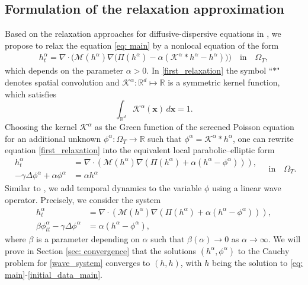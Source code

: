 \documentclass[11pt]{article}
\numberwithin{equation}{section}
\newtheorem{counter example}[theorem]{Counter Example}
\numberwithin{equation}{section}
\numberwithin{equation}{section}
\begin{document}
\subsection{Formulation of the relaxation approximation}
Based on the relaxation approaches for diffusive-dispersive equations in \cite{corli2012singular, corli2014parabolic}, we propose to relax the equation \eqref{eq: main} by a nonlocal equation of the form 
\begin{align}\label{first_relaxation}
    h^{\alpha}_t=\nabla\cdot\big(\mathcal{M}(h^{\alpha})\nabla \big(\Pi(h^{\alpha})-\alpha (\mathcal{K}^{\alpha} \ast h^{\alpha}-h^{\alpha})\big)\big)\quad \mathrm{in}\quad \Omega_T,
\end{align}
which depends on the parameter $\alpha>0$. In \eqref{first_relaxation} the symbol ``$\ast$" denotes spatial convolution and $\mathcal{K}^{\alpha}: \mathbb{R}^d\mapsto \mathbb{R}$ is a symmetric kernel function, which satisfies 
\[
\int_{\mathbb{R}^d} \mathcal{K}^{\alpha}(\mathbf{x})\, d\mathbf{x}=1.
\]
Choosing the kernel $\mathcal{K}^\alpha$ as the Green function \cite{corli2012singular} of the screened Poisson equation for an additional unknown $\phi^{\alpha}:\Omega_T\rightarrow \mathbb{R}$ such that $\phi^{\alpha}=\mathcal{K}^{\alpha}\ast h^{\alpha}$,  
one can rewrite equation \eqref{first_relaxation} into the equivalent local parabolic–elliptic form
\begin{equation}\label{local_relaxation}
\begin{aligned}
h^{\alpha}_t&=\nabla\cdot(\mathcal{M}(h^{\alpha})\nabla(\Pi(h^{\alpha})+\alpha(h^{\alpha}-\phi^{\alpha}))),\\
   -\gamma \Delta \phi^{\alpha}+\alpha \phi^{\alpha}&=\alpha h^{\alpha}
\end{aligned}
\quad \mathrm{in}\quad \Omega_T.
\end{equation}
Similar to \cite{barthwal2025relaxation, dhaouadi2025first}, we add temporal dynamics to the variable $\phi$ using a linear wave operator. Precisely, we consider the system
\begin{equation}\label{wave_system}
\begin{aligned}
h^{\alpha}_t&=\nabla\cdot(\mathcal{M}(h^{\alpha})\nabla(\Pi(h^{\alpha})+\alpha(h^{\alpha}-\phi^{\alpha}))),\\
   \beta \phi^{\alpha}_{tt}-\gamma \Delta \phi^{\alpha}&=\alpha(h^{\alpha}-\phi^{\alpha}),
\end{aligned}
\end{equation}
where $\beta$ is a parameter depending on $\alpha$ such that $\beta(\alpha)\rightarrow 0$ as $\alpha\rightarrow \infty$. We will prove in Section \ref{sec: convergence} that the solutions $(h^\alpha, \phi^\alpha)$ to the Cauchy problem for \eqref{wave_system} converges to $(h, h)$, with $h$ being the solution to \eqref{eq: main}-\eqref{initial_data_main}.
\end{document}

